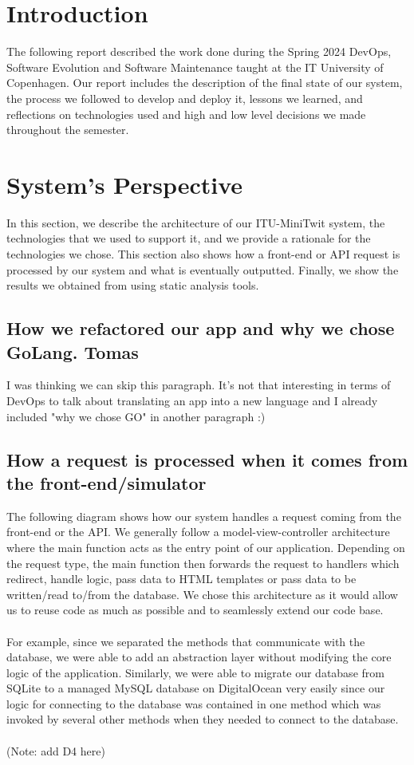 \documentclass{article}
\begin{document}
\section{Introduction}
The following report described the work done during the Spring 2024 DevOps, Software Evolution and Software Maintenance taught at the IT University of Copenhagen. Our report includes the description of the final state of our system, the process we followed to develop and deploy it, lessons we learned, and reflections on technologies used and high and low level decisions we made throughout the semester.

\section{System's Perspective}
In this section, we describe the architecture of our ITU-MiniTwit system, the technologies that we used to support it, and we provide a rationale for the technologies we chose. This section also shows how a front-end or API request is processed by our system and what is eventually outputted. Finally, we show the results we obtained from using static analysis tools.

\subsection{How we refactored our app and why we chose GoLang. Tomas}

I was thinking we can skip this paragraph. It's not that interesting in terms of DevOps to talk about translating an app into a new language and I already included "why we chose GO" in another paragraph :)

\subsection{How a request is processed when it comes from the front-end/simulator}
The following diagram shows how our system handles a request coming from the front-end or the API. We generally follow a model-view-controller architecture where the main function acts as the entry point of our application. Depending on the request type, the main function then forwards the request to handlers which redirect, handle logic, pass data to HTML templates or pass data to be written/read to/from the database. We chose this architecture as it would allow us to reuse code as much as possible and to seamlessly extend our code base. 
\\\\
For example, since we separated the methods that communicate with the database, we were able to add an abstraction layer without modifying the core logic of the application. Similarly, we were able to migrate our database from SQLite to a managed MySQL database on DigitalOcean very easily since our logic for connecting to the database was contained in one method which was invoked by several other methods when they needed to connect to the database.
\\\\
(Note: add D4 here)
\end{document}

